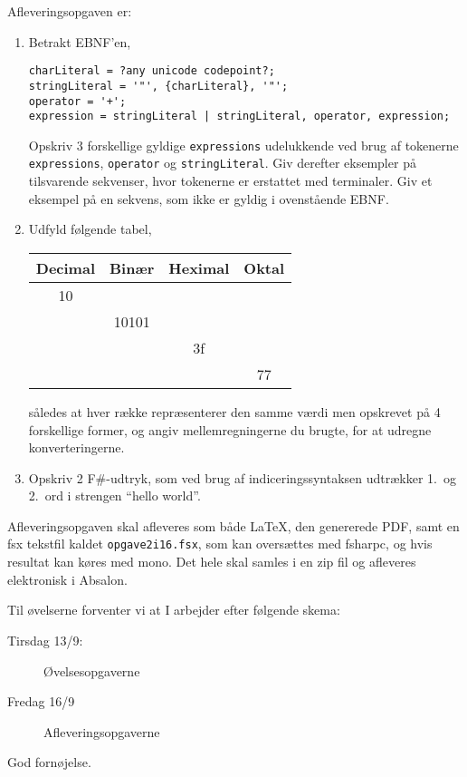 \documentclass[a4paper,12pt]{article}
\begin{document}
Afleveringsopgaven er:
\begin{enumerate}[label=2i.\arabic*,start=0]
\item Betrakt EBNF'en,
\begin{lstlisting}[language=ebnf]
charLiteral = ?any unicode codepoint?;
stringLiteral = '"', {charLiteral}, '"';
operator = '+';
expression = stringLiteral | stringLiteral, operator, expression;
\end{lstlisting}
Opskriv 3 forskellige gyldige \lstinline[language=ebnf]{expressions} udelukkende ved brug af tokenerne \lstinline[language=ebnf]{expressions},  \lstinline[language=ebnf]{operator} og \lstinline[language=ebnf]{stringLiteral}. Giv derefter eksempler på tilsvarende sekvenser, hvor tokenerne er erstattet med terminaler. Giv et eksempel på en sekvens, som ikke er gyldig i ovenstående EBNF.
\item Udfyld følgende tabel,
  \begin{center}
    \begin{tabular}{|c|c|c|c|}
      \hline
      Decimal & Binær & Heximal & Oktal\\
      \hline
              10 &  &  & \\
      \hline
              & 10101 &  & \\
      \hline
               &  & 3f  & \\
      \hline
              &  &  & 77 \\
      \hline
    \end{tabular}
  \end{center}
således at hver række repræsenterer den samme værdi men opskrevet på 4 forskellige former, og angiv mellemregningerne du brugte, for at udregne konverteringerne.
\item Opskriv 2 F\#-udtryk, som ved brug af indiceringssyntaksen udtrækker 1.\ og 2.\ ord i strengen "`hello world"'.
\end{enumerate}
Afleveringsopgaven skal afleveres som både LaTeX, den genererede PDF,
samt en fsx tekstfil kaldet \verb|opgave2i16.fsx|, som kan oversættes med fsharpc, og hvis resultat kan køres med mono. Det hele skal samles i en zip fil og afleveres elektronisk i Absalon.

Til øvelserne forventer vi at I arbejder efter følgende skema:
\begin{description}
\item[Tirsdag 13/9:] Øvelsesopgaverne
\item[Fredag 16/9]  Afleveringsopgaverne
\end{description}


\flushright God fornøjelse.
\end{document}
